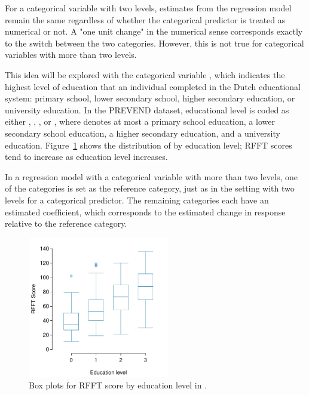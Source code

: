 For a categorical variable with two levels, estimates from the regression model remain the same regardless of whether the categorical predictor is treated as numerical or not. A "one unit change" in the numerical sense corresponds exactly to the switch between the two categories. However, this is not true for categorical variables with more than two levels. 

This idea will be explored with the categorical variable , which indicates the highest level of education that an individual completed in the Dutch educational system: primary school, lower secondary school, higher secondary education, or university education. In the PREVEND dataset, educational level is coded as either , , , or , where  denotes at most a primary school education,  a lower secondary school education,  a higher secondary education, and  a university education. Figure~\ref{prevendRFFTEducBoxPlot} shows the distribution of  by education level; RFFT scores tend to increase as education level increases. 

In a regression model with a categorical variable with more than two levels, one of the categories is set as the reference category, just as in the setting with two levels for a categorical predictor. The remaining categories each have an estimated coefficient, which corresponds to the estimated change in response relative to the reference category. 

\begin{figure}[h]
	\centering
	\includegraphics[width=0.55\textwidth]
	{ch_multiple_linear_regression_oi_biostat/figures/prevendRFFTEducBoxPlot/prevendRFFTEducBoxPlot.pdf}
	\caption{Box plots for RFFT score by education level in .}
	\label{prevendRFFTEducBoxPlot}
\end{figure}

